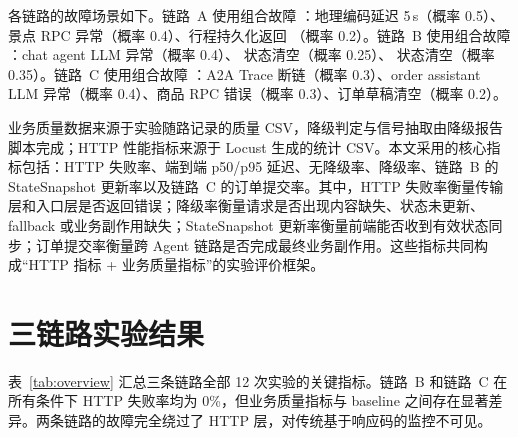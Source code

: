各链路的故障场景如下。链路~A 使用组合故障 ：地理编码延迟 5\,s（概率 0.5）、景点 RPC 异常（概率 0.4）、行程持久化返回 （概率 0.2）。链路~B 使用组合故障 ：chat agent LLM 异常（概率 0.4）、 状态清空（概率 0.25）、 状态清空（概率 0.35）。链路~C 使用组合故障 ：A2A Trace 断链（概率 0.3）、order assistant LLM 异常（概率 0.4）、商品 RPC 错误（概率 0.3）、订单草稿清空（概率 0.2）。

业务质量数据来源于实验随路记录的质量 CSV，降级判定与信号抽取由降级报告脚本完成；HTTP 性能指标来源于 Locust 生成的统计 CSV。本文采用的核心指标包括：HTTP 失败率、端到端 p50/p95 延迟、无降级率、降级率、链路~B 的 StateSnapshot 更新率以及链路~C 的订单提交率。其中，HTTP 失败率衡量传输层和入口层是否返回错误；降级率衡量请求是否出现内容缺失、状态未更新、fallback 或业务副作用缺失；StateSnapshot 更新率衡量前端能否收到有效状态同步；订单提交率衡量跨 Agent 链路是否完成最终业务副作用。这些指标共同构成“HTTP 指标 + 业务质量指标”的实验评价框架。

\section{三链路实验结果}

表~\ref{tab:overview} 汇总三条链路全部 12 次实验的关键指标。链路~B 和链路~C 在所有条件下 HTTP 失败率均为 0\%，但业务质量指标与 baseline 之间存在显著差异。两条链路的故障完全绕过了 HTTP 层，对传统基于响应码的监控不可见。

